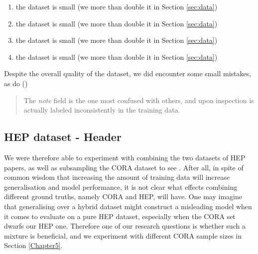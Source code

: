 \begin{enumerate}
\item the dataset is small (we more than double it in Section \ref{sec:data})
\item the dataset is small (we more than double it in Section \ref{sec:data})
\item the dataset is small (we more than double it in Section \ref{sec:data})
\item the dataset is small (we more than double it in Section \ref{sec:data})
\end{enumerate}

Despite the overall quality of the dataset, we did encounter some small mistakes, as do (\cite{Peng04accurateinformation})

\blockquote{The \emph{note} field is the one most confused with others, and upon inspection is actually labeled inconsistently in the training data.}

\subsection{HEP dataset - Header}
\label{subsec:hepdatasetheader}

We were therefore able to experiment with combining the two datasets of HEP papers, as well as subsampling the CORA dataset to see . After all, in spite of common wisdom that increasing the amount of training data will increase generalisation and model performance, it is not clear what effects combining different ground truths, namely CORA and HEP, will have. One may imagine that generalising over a hybrid dataset might construct a misleading model when it comes to evaluate on a pure HEP dataset, especially when the CORA set dwarfs our HEP one. Therefore one of our research questions is whether such a mixture is beneficial, and we experiment with different CORA sample sizes in Section \ref{Chapter5}.

